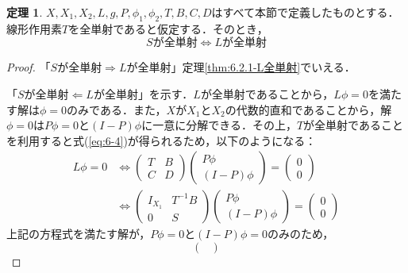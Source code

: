 \documentclass[11pt,a4paper,titlepage]{jsreport}
\theoremstyle{definition}
\newtheorem{thm}{定理}
\begin{document}
\begin{thm}
  \label{thm:Sが全単射->Lが全単射}
  $X,X_1,X_2,L,g,P,\phi_1,\phi_2,T,B,C,D$はすべて本節で定義したものとする．線形作用素$T$を全単射であると仮定する．そのとき，
  \begin{equation*}
    Sが全単射 \Leftrightarrow Lが全単射
  \end{equation*}
\end{thm}

\begin{proof}
  「$Sが全単射 \Rightarrow Lが全単射$」定理\ref{thm:6.2.1-L全単射}でいえる．

  「$Sが全単射 \Leftarrow Lが全単射$」を示す．$L$が全単射であることから，$L\phi=0$を満たす解は$\phi = 0$のみである．また，$X$が$X_1$と$X_2$の代数的直和であることから，解$\phi=0$は$P\phi=0$と$(I-P)\phi$に一意に分解できる．その上，$T$が全単射であることを利用すると式(\ref{eq:6-4})が得られるため，以下のようになる：
  \begin{equation*}
    \begin{split}
      L\phi=0 &\Leftrightarrow
      \begin{pmatrix}
        T & B \\
        C & D
      \end{pmatrix}
      \begin{pmatrix}
        P \phi \\
        (I-P) \phi
      \end{pmatrix}
      =
      \begin{pmatrix}
        0 \\
        0
      \end{pmatrix}
      \\&\Leftrightarrow
      \begin{pmatrix}
        I_{X_1} & T^{-1}B \\
        0 & S
      \end{pmatrix}
      \begin{pmatrix}
        P \phi \\
        (I-P) \phi
      \end{pmatrix}
      =
      \begin{pmatrix}
        0 \\
        0
      \end{pmatrix}
    \end{split}
  \end{equation*}
  上記の方程式を満たす解が，$P\phi=0$と$(I-P)\phi=0$のみのため，
  \begin{equation*}
    \begin{pmatrix}

\end{pmatrix}
\end{equation*}
\end{proof}
\end{document}
